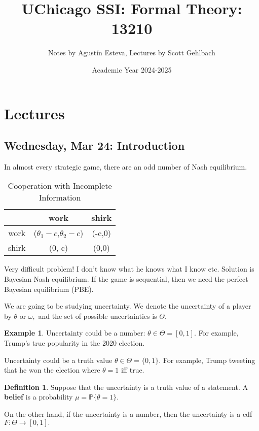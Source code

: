\documentclass[10pt, oneside]{article}
\title{UChicago SSI: Formal Theory: 13210}
\author{Notes by Agustín Esteva, Lectures by Scott Gehlbach}
\date{Academic Year 2024-2025}
\newcommand{\bbP}{\mathbb{P}}
\theoremstyle{definition}
\newtheorem{exmp}{Example}[section]
\newtheorem{defn}{Definition}
\begin{document}
\maketitle
\tableofcontents

\vspace{.25in}

\section{Lectures}

\subsection{Wednesday, Mar 24: Introduction}
In almost every strategic game, there are an odd number of Nash equilibrium.
    \begin{table}[H]
        \centering
        \begin{tabular}{c|c|c}
             & work & shirk\\
             \hline
             work& ($\theta_1 -c$,$\theta_2 - c$) & (-c,0) \\
             \hline
             shirk&  (0,-c)& (0,0)\\
        \end{tabular}
        \caption{Cooperation with Incomplete Information}
    \end{table}
Very difficult problem! I don't know what he knows what I know etc. Solution is Bayesian Nash equilibrium. If the game is sequential, then we need the perfect Bayesian equilibrium (PBE).


    We are going to be studying uncertainty. We denote the uncertainty of a player by $\theta$ or $\omega,$ and the set of possible uncertainties is $\Theta.$ 

\begin{exmp}
    Uncertainty could be a number: $\theta \in \Theta = [0,1].$ For example, Trump's true popularity in the 2020 election.

    Uncertainty could be a truth value $\theta \in \Theta = \{0,1\}.$ For example, Trump tweeting that he won the election where $\theta = 1$ iff true.
\end{exmp}

\begin{defn}
    Suppose that the uncertainty is a truth value of a statement. A \textbf{belief} is a probability $\mu = \bbP\{\theta  = 1\}.$ 

    On the other hand, if the uncertainty is a number, then the uncertainty is a cdf $F: \Theta \to [0,1].$ 
\end{defn}
\end{document}
